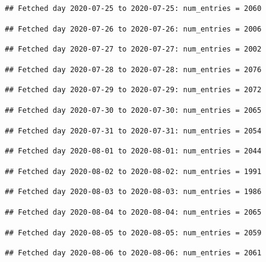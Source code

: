 \documentclass[]{article}
\begin{document}
\begin{verbatim}
## Fetched day 2020-07-25 to 2020-07-25: num_entries = 2060
\end{verbatim}

\begin{verbatim}
## Fetched day 2020-07-26 to 2020-07-26: num_entries = 2006
\end{verbatim}

\begin{verbatim}
## Fetched day 2020-07-27 to 2020-07-27: num_entries = 2002
\end{verbatim}

\begin{verbatim}
## Fetched day 2020-07-28 to 2020-07-28: num_entries = 2076
\end{verbatim}

\begin{verbatim}
## Fetched day 2020-07-29 to 2020-07-29: num_entries = 2072
\end{verbatim}

\begin{verbatim}
## Fetched day 2020-07-30 to 2020-07-30: num_entries = 2065
\end{verbatim}

\begin{verbatim}
## Fetched day 2020-07-31 to 2020-07-31: num_entries = 2054
\end{verbatim}

\begin{verbatim}
## Fetched day 2020-08-01 to 2020-08-01: num_entries = 2044
\end{verbatim}

\begin{verbatim}
## Fetched day 2020-08-02 to 2020-08-02: num_entries = 1991
\end{verbatim}

\begin{verbatim}
## Fetched day 2020-08-03 to 2020-08-03: num_entries = 1986
\end{verbatim}

\begin{verbatim}
## Fetched day 2020-08-04 to 2020-08-04: num_entries = 2065
\end{verbatim}

\begin{verbatim}
## Fetched day 2020-08-05 to 2020-08-05: num_entries = 2059
\end{verbatim}

\begin{verbatim}
## Fetched day 2020-08-06 to 2020-08-06: num_entries = 2061
\end{verbatim}
\end{document}
